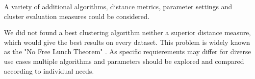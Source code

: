 A variety of additional algorithms, distance metrics, parameter settings and cluster evaluation measures could be considered.

We did not found a best clustering algorithm neither a superior distance measure, which would give the best results on every dataset. This problem is widely known as the "No Free Lunch Theorem" \cite{nofreelunch}. As specific requierements may differ for diverse use cases multiple algorithms and parameters should be explored and compared according to individual needs. 